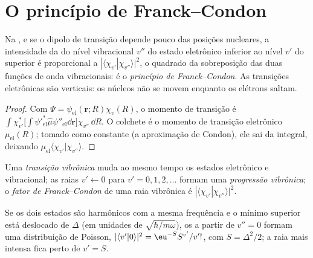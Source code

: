 \section{O princípio de Franck--Condon}

\begin{theorem}\label{thm:b3:electronic-spectroscopy:franck-condon}
Na , e se o dipolo de transição depende pouco
das posições nucleares, a intensidade da  do nível
vibracional $v''$ do estado eletrônico inferior ao nível $v'$ do superior é
proporcional a $|\langle\chi_{v'}|\chi_{v''}\rangle|^2$, o quadrado da
sobreposição das duas funções de onda vibracionais: é o \emph{princípio de
Franck--Condon}. As
transições eletrônicas são verticais: os núcleos não se movem enquanto os elétrons saltam.
\end{theorem}

\begin{proof}
Com $\Psi = \psi_{\mathrm{el}}(\mathbf r;R)\chi_v(R)$, o momento de transição é
$\int\chi_{v'}^*\big[\int\psi'^*_{\mathrm{el}}\hat\mu\psi''_{\mathrm{el}}\dd\mathbf r\big]
\chi_{v''}\,\dd R$. O colchete é o momento de transição eletrônico
$\mu_{\mathrm{el}}(R)$; tomado como constante (a aproximação de Condon), ele sai da
integral, deixando $\mu_{\mathrm{el}}\langle\chi_{v'}|\chi_{v''}\rangle$.
\end{proof}

\begin{definition}\label{def:b3:electronic-spectroscopy:vibronic}
Uma \emph{transição vibrônica} muda ao mesmo
tempo os estados eletrônico e vibracional; as raias $v' \leftarrow 0$ para $v' = 0, 1, 2,
\dots$ formam uma \emph{progressão vibrônica}; o
\emph{fator de Franck--Condon} de uma raia vibrônica é
$|\langle\chi_{v'}|\chi_{v''}\rangle|^2$.
\end{definition}

\begin{proposition}\label{prop:b3:electronic-spectroscopy:displaced}
Se os dois estados são harmônicos com a mesma frequência e o mínimo superior
está deslocado de $\Delta$ (em unidades de $\sqrt{\hbar/m\omega}$), os  a partir de $v'' = 0$ formam uma distribuição de Poisson,
$|\langle v'|0\rangle|^2 = \eu^{-S}S^{v'}/v'!$, com $S = \Delta^2/2$; a raia mais intensa
fica perto de $v' = S$.
\end{proposition}
\admitted

